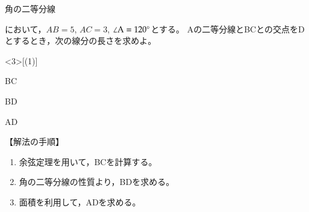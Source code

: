 \documentclass[a4j,fleqn]{jarticle}
\begin{document}
\def\tyuumark{$\blacktriangleleft$}
\def\tyuuitemizeoption{%
  \labelwidth=6pt\labelsep=3pt\leftmargin9pt\footnotesize}
\begin{itembox}{角の二等分線}
\begin{caprm}
において，$AB=5$, $AC=3$, $\kaku A=120\Deg$とする。
\kaku Aの二等分線とBCとの交点をDとするとき，次の線分の長さを求めよ。
\end{caprm}
\begin{edaenumerate}<3>[(1)]
  \item BC
  \item BD
  \item AD
\end{edaenumerate}
\end{itembox}\bigskip

\noindent 【解法の手順】\vspace{1ex}

\begin{small}
\begin{rectbox}[sensyu=\protect\hasen]
\begin{enumerate}[\protect\expandafter\fbox1]
  \item 余弦定理を用いて，BCを計算する。
  \item 角の二等分線の性質より，BDを求める。
  \item 面積を利用して，ADを求める。
\end{enumerate}
\end{rectbox}
\end{small}\bigskip
\end{document}
